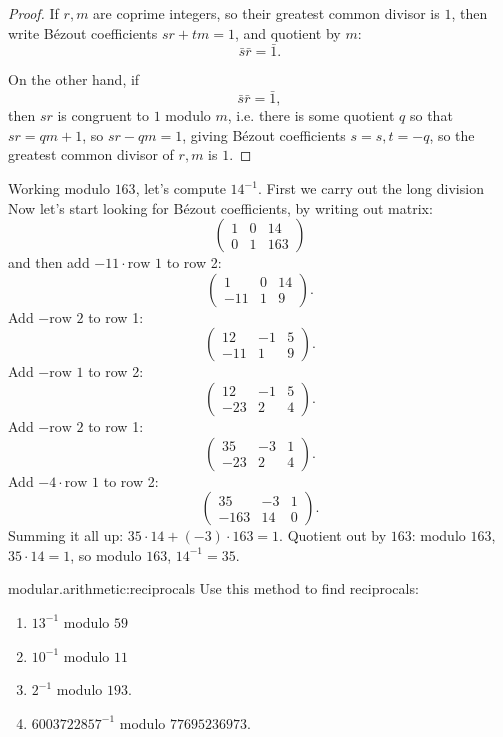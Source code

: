 \begin{proof}
If \(r,m\) are coprime integers, so their greatest common divisor is \(1\), then write B\'ezout coefficients \(sr+tm=1\), and quotient by \(m\):
\[
\bar{s}\bar{r}=\bar{1}.
\]

On the other hand, if 
\[
\bar{s}\bar{r}=\bar{1},
\]
then \(sr\) is congruent to \(1\) modulo \(m\), i.e. there is some quotient \(q\) so that \(sr=qm+1\), so \(sr-qm=1\), giving B\'ezout coefficients \(s=s,t=-q\), so the greatest common divisor of \(r,m\) is \(1\).
\end{proof}
\begin{example}
Working modulo \(163\), let's compute \(14^{-1}\).
First we carry out the long division
Now let's start looking for B\'ezout coefficients, by writing out matrix:
\[
\begin{pmatrix}
1 & 0 & 14 \\
0 & 1 & 163
\end{pmatrix}
\]
and then add \(-11\cdot\text{row 1}\) to row 2:
\[
\begin{pmatrix}
1 & 0 & 14 \\
-11 & 1 & 9
\end{pmatrix}.
\]
Add \(-\text{row 2}\) to row 1:
\[
\begin{pmatrix}
12 & -1 & 5 \\
-11 & 1 & 9
\end{pmatrix}.
\]
Add \(-\text{row 1}\) to row 2:
\[
\begin{pmatrix}
12 & -1 & 5 \\
-23 & 2 & 4
\end{pmatrix}.
\]
Add \(-\text{row 2}\) to row 1:
\[
\begin{pmatrix}
35 & -3 & 1 \\
-23 & 2 & 4
\end{pmatrix}.
\]
Add \(-4 \cdot \text{row 1}\) to row 2:
\[
\begin{pmatrix}
35 & -3 & 1 \\
-163 & 14 & 0
\end{pmatrix}.
\]
Summing it all up: \(35 \cdot 14 + (-3) \cdot 163 = 1\).
Quotient out by \(163\): modulo \(163\), \(35 \cdot 14 = 1\), so modulo \(163\), \(14^{-1}=35\).
\end{example}
\begin{problem}{modular.arithmetic:reciprocals}
Use this method to find reciprocals:
\begin{enumerate}
\item 
\(13^{-1}\) modulo \(59\)
\item
\(10^{-1}\) modulo \(11\)
\item
\(2^{-1}\) modulo \(193\).
\item
\(6003722857^{-1}\) modulo \(77695236973\).
\end{enumerate}
\end{problem}
